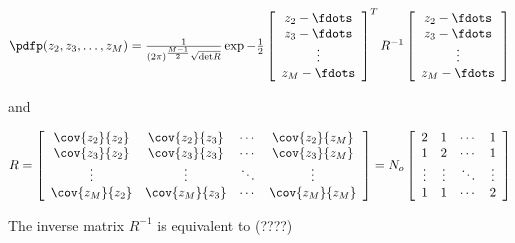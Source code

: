 {\begin{theorem}
\begin{math}
\pdfp(z_2,z_3,\ldots,z_M)
   =
   \frac{1}{(2\pi)^\frac{M-1}{2}\sqrt{\mathrm{det}{R}}}
   \exp{
      -\frac{1}{2}
      \left[
      \begin{array}{c}
         z_2 - \fdots \\
         z_3 - \fdots \\
         \vdots \\
         z_M - \fdots
      \end{array}
      \right]^T
      R^{-1}
      \left[
      \begin{array}{c}
         z_2 - \fdots \\
         z_3 - \fdots \\
         \vdots \\
         z_M - \fdots
      \end{array}
      \right]
   }
\end{math}

and

\[
   R =
   \left[
   \begin{array}{cccc}
      \cov{z_2}{z_2}  & \cov{z_2}{z_3} & \cdots & \cov{z_2}{z_M}  \\
      \cov{z_3}{z_2}  & \cov{z_3}{z_3} & \cdots & \cov{z_3}{z_M}  \\
      \vdots          & \vdots         & \ddots & \vdots          \\
      \cov{z_M}{z_2}  & \cov{z_M}{z_3} & \cdots & \cov{z_M}{z_M}
   \end{array}
   \right]
   =
   N_o \left[
   \begin{array}{cccc}
      2      & 1      &  \cdots &  1     \\
      1      & 2      &  \cdots &  1     \\
      \vdots & \vdots &  \ddots & \vdots \\
      1      & 1      &  \cdots &  2
   \end{array}
   \right]
\]


The inverse matrix $R^{-1}$ is equivalent to (????) \attention


\end{theorem}}
